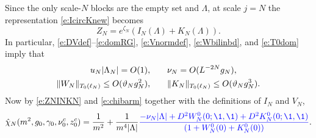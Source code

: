 Since the only scale-$N$ blocks are the empty set and $\Lambda$, at scale $j = N$
the representation \eqref{e:IcircKnew} becomes
\begin{equation}
\label{e:ZNINKN}
Z_N = e^{\zeta_N} (I_N(\Lambda) + K_N(\Lambda)).
\end{equation}
In particular, \eqref{e:DVdef}--\eqref{e:domRG},
\eqref{e:Vnormdef}, \eqref{e:Wbilinbd}, and \eqref{e:T0dom} imply that
\begin{align}
\label{e:unu-bd}
u_N |\Lambda_N| = O(1),
	&\qquad
\nu_N = O(L^{-2 N} g_N),
	\\
\label{e:WKbd}
\|W_N\|_{T_0(\ell_N)} \le O(\vartheta_N g_N^2),
	&\qquad
\|K_N\|_{T_0(\ell_N)} \le O(\vartheta_N g_N^3).
\end{align}
Now by \eqref{e:ZNINKN} and \eqref{e:chibarm} together with the definitions of
$I_N$ and $V_N$,
\begin{equation}
\label{e:chiNhat-approx}
\hat\chi_N(m^2, \gcc_0, \gamma_0, \nu_0^c, z_0^c)
	=
\frac{1}{m^2}
	+
\frac{1}{m^4 |\Lambda|}
\new{
\frac
{-\nu_N |\Lambda| + D^2 W^0_N(0; \1, \1) + D^2 K^0_N(0; \1, \1)}
{(1 + W^0_N(0) + K^0_N(0))}}.
\end{equation}


